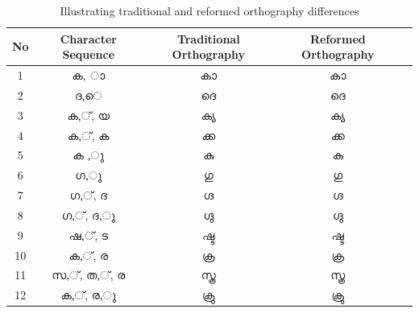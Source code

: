 \documentclass[10pt]{article}
\begin{document}
\begin{table}
	\centering
	
	\begin{tabular}{|c|c|c|c|c}
		\hline
		No & Character Sequence & Traditional Orthography & Reformed Orthography \\ \hline \hline
		1 & {\manjari ക, ാ} & {\manjari കാ} & {\raghu കാ} \\
		\hline
		2 &  {\manjari ദ,െ} & {\manjari ദെ} & {\raghu ദെ}  \\
		\hline
		3 & {\manjari ക,്, യ} & {\manjari ക്യ} & {\raghu ക്യ} \\
		\hline
		4 & {\manjari ക,്, ക} & {\manjari ക്ക} & {\raghu ക്ക} \\
		\hline
		5 & {\manjari ക ,ു} & {\manjari കു} & {\raghu കു} \\
		\hline
		6 & {\manjari ഗ,ു} & {\manjari ഗു} & {\raghu ഗു} \\
		\hline
		7 & {\manjari ഗ,്, ദ} & {\manjari ഗ്ദ} & {\raghu ഗ്ദ} \\
		\hline
		8 & {\manjari ഗ,്, ദ,ു} & {\manjari ഗ്ദു} & {\raghu ഗ്ദു} \\
		\hline
		9 & {\manjari ഷ,്, ട} & {\manjari ഷ്ട} & {\raghu ഷ്ട} \\	
		\hline
		10 & {\manjari ക,്, ര} & {\manjari ക്ര} & {\raghu ക്ര} \\
		\hline
		11 & {\manjari സ,്, ത,്, ര} & {\manjari സ്ത്ര} & {\raghu സ്ത്ര} \\
		\hline
		12 & {\manjari ക,്, ര,ു} & {\manjari ക്രു} & {\raghu ക്രു} \\
		\hline
		
	\end{tabular}
	\caption{Illustrating traditional and reformed orthography differences}
	\label{orthographycomparison}
\end{table}
\end{document}
